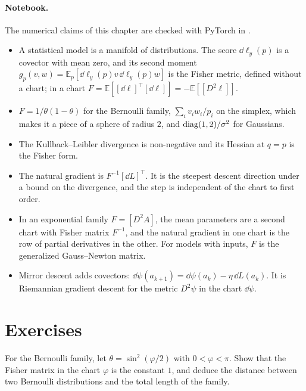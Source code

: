 \begin{notechapter}
\paragraph{Notebook.} The numerical claims of this chapter are checked
with PyTorch in .

\begin{chaptersummary}
\begin{itemize}[nosep]
  \item A statistical model is a manifold of distributions. The score
        $\dd\ell_y(p)$ is a covector with mean zero, and its second
        moment $g_p(v, w) = \mathbb E_p[\dd\ell_y(p)v\,\dd\ell_y(p)w]$ is
        the Fisher metric, defined without a chart; in a chart
        $F = \mathbb E[[\dd\ell]^\top[\dd\ell]]
        = -\mathbb E[[D^2\ell]]$.
  \item $F = 1/\theta(1 - \theta)$ for the Bernoulli family,
        $\sum_iv_iw_i/p_i$ on the simplex, which makes it a piece of a
        sphere of radius $2$, and $\operatorname{diag}(1, 2)/\sigma^2$ for Gaussians.
  \item The Kullback--Leibler divergence is non-negative and its Hessian
        at $q = p$ is the Fisher form.
  \item The natural gradient is $F^{-1}[\dd L]^\top$. It is the steepest
        descent direction under a bound on the divergence, and the step
        is independent of the chart to first order.
  \item In an exponential family $F = [D^2A]$, the mean parameters are a
        second chart with Fisher matrix $F^{-1}$, and the natural
        gradient in one chart is the row of partial derivatives in the
        other. For models with inputs, $F$ is the generalized
        Gauss--Newton matrix.
  \item Mirror descent adds covectors: $\dd\psi(a_{k+1}) = \dd\psi(a_k)
        - \eta\,\dd L(a_k)$. It is Riemannian gradient descent for the
        metric $D^2\psi$ in the chart $\dd\psi$.
\end{itemize}
\end{chaptersummary}

\section*{Exercises}

\begin{exercise}\label{natural-gradient:exr:1}
For the Bernoulli family, let $\theta = \sin^2(\varphi/2)$ with
$0 < \varphi < \pi$. Show that the Fisher matrix in the chart $\varphi$
is the constant $1$, and deduce the distance between two Bernoulli
distributions and the total length of the family.
\end{exercise}


\end{notechapter}
